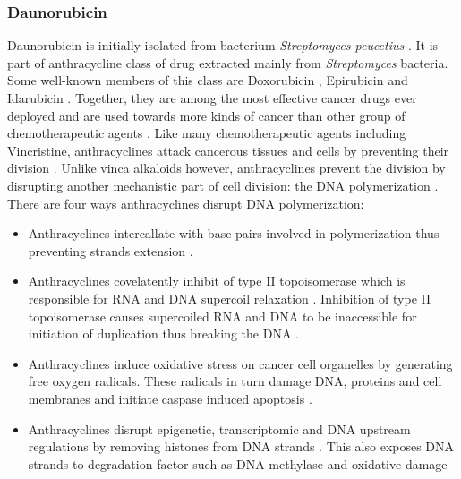 \documentclass[pdftex,12pt,a4paper]{report}
\begin{document}
\subsubsection*{Daunorubicin}

Daunorubicin is initially isolated from bacterium \textit{Streptomyces peucetius} \cite{otten1990cloning, lin2011chiral}. It is part of anthracycline class of drug \cite{gewirtz1999critical} extracted mainly from \textit{Streptomyces} bacteria. Some well-known members of this class are Doxorubicin \cite{nci2018defdoxorubicin}, Epirubicin \cite{nci2018defepirubicin} and Idarubicin \cite{nci2018defidarubicin}. Together, they are among the most effective cancer drugs ever deployed and are used towards more kinds of cancer than other group of chemotherapeutic agents \cite{weiss1992anthracyclines, minotti2004anthracyclines, peng2005cardiotoxicology}. Like many chemotherapeutic agents including Vincristine, anthracyclines attack cancerous tissues and cells by preventing their division \cite{drugs2018defdaunorubicin}. Unlike vinca alkaloids however, anthracyclines prevent the division by disrupting another mechanistic part of cell division: the DNA polymerization \cite{gewirtz1999critical}. There are four ways anthracyclines disrupt DNA polymerization:

\begin{itemize}
\item Anthracyclines intercallate with base pairs involved in polymerization thus preventing strands extension \cite{takimoto2008principles}.

\item Anthracyclines covelatently inhibit of type II topoisomerase which is responsible for RNA and DNA supercoil relaxation \cite{wang2002cellular}. Inhibition of type II topoisomerase causes supercoiled RNA and DNA to be inaccessible for initiation of duplication thus breaking the DNA \cite{tewey1984adriamycin}.

\item Anthracyclines induce oxidative stress on cancer cell organelles by generating free oxygen radicals. These radicals in turn damage DNA, proteins and cell membranes and initiate caspase induced apoptosis \cite{vsimuunek2009anthracycline, halliwell1994free}.

\item Anthracyclines disrupt epigenetic, transcriptomic and DNA upstream regulations by removing histones from DNA strands \cite{pang2013drug}. This also exposes DNA strands to degradation factor such as DNA methylase \cite{vaissiere2008epigenetic} and oxidative damage \cite{ljungman1992efficient}
\end{itemize}
\end{document}
